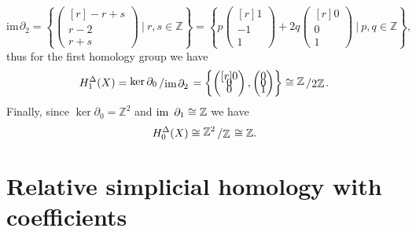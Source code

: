 \documentclass[11pt]{book}
\numberwithin{dummy}{section}
\theoremstyle{nonumberbreak}
\newenvironment{ex}[1][]{\ifthenelse{\equal{#1}{}}{\example}{\example[#1]}\rm}{\endexample}
\newcommand{\im}{\mathrm{im} \hspace{1.5pt}}
\newcommand{\Z}{\mathbb{Z}}
\newcommand{\slant}[2]{{\raisebox{.1em}{$#1$}\left/\raisebox{-.1em}{$#2$}\right.}}
\begin{document}
\begin{spacing}{1.4}
\begin{ex}
$$\mathrm{im} \hspace{1pt} \partial_2 = \left\{ \begin{pmatrix}[r] -r +s\\[-6pt] r-2 \\[-6pt] r+s\end{pmatrix} \ \bigg\vert \ r,s \in \mathbb{Z} \right\} = \left\{ p \begin{pmatrix}[r]1\\[-6pt]-1\\[-6pt]1\end{pmatrix} + 2q \begin{pmatrix}[r]0\\[-6pt]0\\[-6pt] 1\end{pmatrix} \ \bigg\vert \ p,q \in \mathbb{Z} \right\},$$
thus for the first homology group we have
$$H_1^{\Delta}(X) = \slant{\ker \partial_0}{\mathrm{im} \hspace{1pt}\partial_2} = \left\{ \begin{pmatrix}[r]0\\[-6pt]0\\[-6pt]0\end{pmatrix}, \begin{pmatrix}0\\[-6pt]0\\[-6pt]1\end{pmatrix} \right\} \cong \slant{\mathbb{Z}}{2\mathbb{Z}}.$$
Finally, since $\ker \partial_0=\mathbb{Z}^2$ and $\im\ \partial_1 \cong \Z$
we have
$$H_0^{\Delta}(X) \cong \slant{\mathbb{Z}^2}{\mathbb{Z}} \cong \mathbb{Z}.$$



\end{ex}








\section{Relative simplicial homology with coefficients} %






\end{spacing}
\end{document}
